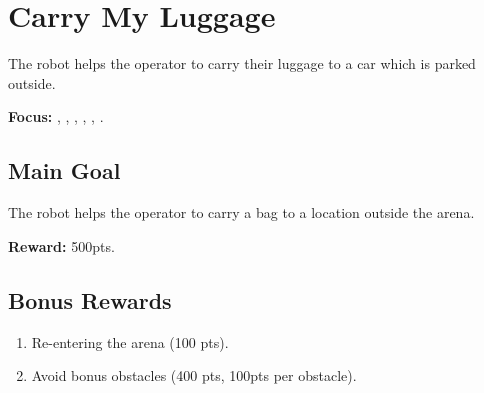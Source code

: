 \section{Carry My Luggage}
\label{test:carry-my-luggage}
The robot helps the operator to carry their luggage to a car which is parked outside.

\noindent \textbf{Focus:} \SysI{}, \HRI{}, \PerDet{}, \PerRec, \NAV{}, \MAP{}.

\subsection*{Main Goal}
The robot helps the operator to carry a bag to a location outside the arena.

\noindent\textbf{Reward:} 500pts.

\subsection*{Bonus Rewards}
\begin{enumerate}[nosep]
	\item Re-entering the arena (100 pts).
	\item Avoid bonus obstacles (400 pts, 100pts per obstacle).
\end{enumerate}


